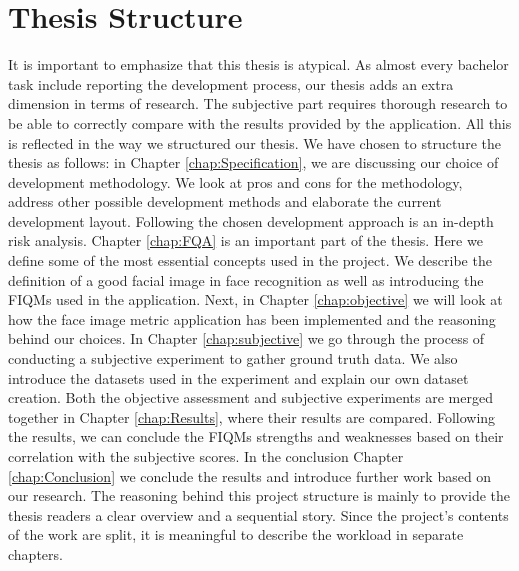 \section{Thesis Structure}
It is important to emphasize that this thesis is atypical. As almost every bachelor task include reporting the development process, our thesis adds an extra dimension in terms of research. The subjective part requires thorough research to be able to correctly compare with the results provided by the application. All this is reflected in the way we structured our thesis. 
We have chosen to structure the thesis as follows: in Chapter \ref{chap:Specification}, we are discussing our choice of development methodology. We look at pros and cons for the methodology, address other possible development methods and elaborate the current development layout. Following the chosen development approach is an in-depth risk analysis. Chapter \ref{chap:FQA} is an important part of the thesis. Here we define some of the most essential concepts used in the project. We describe the definition of a good facial image in face recognition as well as introducing the FIQMs used in the application. Next, in Chapter \ref{chap:objective} we will look at how the face image metric application has been implemented and the reasoning behind our choices. In Chapter \ref{chap:subjective} we go through the process of conducting a subjective experiment to gather ground truth data. We also introduce the datasets used in the experiment and explain our own dataset creation. 
Both the objective assessment and subjective experiments are merged together in Chapter \ref{chap:Results}, where their results are compared. Following the results, we can conclude the FIQMs strengths and weaknesses based on their correlation with the subjective scores. In the conclusion Chapter \ref{chap:Conclusion} we conclude the results and introduce further work based on our research. The reasoning behind this project structure is mainly to provide the thesis readers a clear overview and a sequential story. Since the project's contents of the work are split, it is meaningful to describe the workload in separate chapters. 